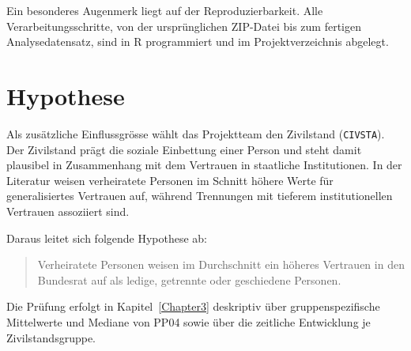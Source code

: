 Ein besonderes Augenmerk liegt auf der Reproduzierbarkeit. Alle Verarbeitungsschritte,
von der ursprünglichen ZIP-Datei bis zum fertigen Analysedatensatz, sind in R
programmiert und im Projektverzeichnis abgelegt.


\section{Hypothese}
\label{sec:hypothese}

Als zusätzliche Einflussgrösse wählt das Projektteam den Zivilstand (\texttt{CIVSTA}).
Der Zivilstand prägt die soziale Einbettung einer Person und steht damit plausibel in
Zusammenhang mit dem Vertrauen in staatliche Institutionen. In der Literatur weisen
verheiratete Personen im Schnitt höhere Werte für generalisiertes Vertrauen auf, während
Trennungen mit tieferem institutionellen Vertrauen assoziiert sind.

Daraus leitet sich folgende Hypothese ab:

\begin{quote}
Verheiratete Personen weisen im Durchschnitt ein höheres Vertrauen in den Bundesrat
auf als ledige, getrennte oder geschiedene Personen.
\end{quote}

Die Prüfung erfolgt in Kapitel~\ref{Chapter3} deskriptiv über gruppenspezifische
Mittelwerte und Mediane von PP04 sowie über die zeitliche Entwicklung je
Zivilstandsgruppe.